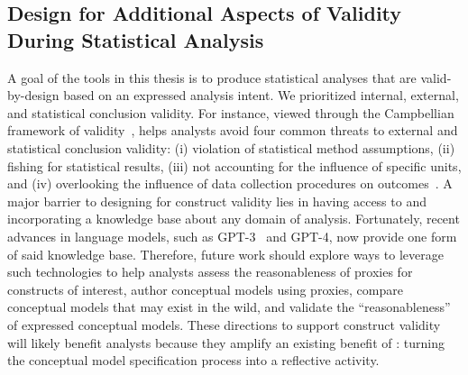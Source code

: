 \subsection{Design for Additional Aspects of Validity During Statistical Analysis}
A goal of the tools in this thesis is to produce statistical analyses that are
valid-by-design based on an expressed analysis intent. We prioritized internal,
external, and statistical conclusion validity. For instance, viewed through the
Campbellian framework of
validity~\cite{campbell2015quasiexperimentalDesigns,cook2002generalizedCausalInference},
\tisane helps analysts avoid four common threats to external and statistical
conclusion validity: (i) violation of statistical method assumptions, (ii)
fishing for statistical results, (iii) not accounting for the influence of
specific units, and (iv) overlooking the influence of data collection procedures
on outcomes~\cite{cook2002generalizedCausalInference}. A major barrier to
designing for construct validity lies in having access to and incorporating a
knowledge base about any domain of analysis. Fortunately, recent advances in
language models, such as GPT-3~\cite{brown2020language} and GPT-4, now provide
one form of said knowledge base. Therefore, future work should explore ways to
leverage such technologies to help analysts assess the reasonableness of proxies
for constructs of interest, author conceptual models using proxies, compare
conceptual models that may exist in the wild, and validate the ``reasonableness''
of expressed conceptual models. These directions to support construct validity
will likely benefit analysts because they amplify an existing benefit of \rTisane: turning
the conceptual model specification process into a reflective activity. 



